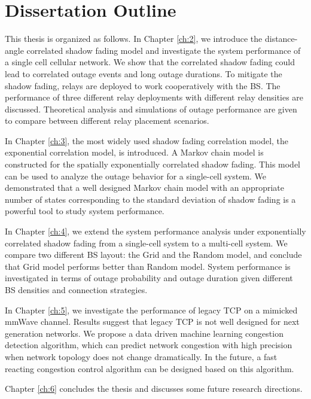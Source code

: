 \section{Dissertation Outline}
\par This thesis is organized as follows. In Chapter \ref{ch:2}, we introduce the distance-angle correlated shadow fading model and investigate the system performance of a single cell cellular network. We show that the correlated shadow fading could lead to correlated outage events and long outage durations. To mitigate the shadow fading, relays are deployed to work cooperatively with the BS. The performance of three different relay deployments with different relay densities are discussed. Theoretical analysis and simulations of outage performance are given to compare between different relay placement scenarios. 
\par In Chapter \ref{ch:3}, the most widely used shadow fading correlation model, the exponential correlation model, is introduced. A Markov chain model is constructed for the spatially exponentially correlated shadow fading. This model can be used to analyze the outage behavior for a single-cell system. We demonstrated that a well designed Markov chain model with an appropriate number of states corresponding to the standard deviation of shadow fading is a powerful tool to study system performance.
\par In Chapter \ref{ch:4}, we extend the system performance analysis under exponentially correlated shadow fading from a single-cell system to a multi-cell system. We compare two different BS layout: the Grid and the Random model, and conclude that Grid model performs better than Random model. System performance is investigated in terms of outage probability and outage duration given different BS densities and connection strategies. 
\par In Chapter \ref{ch:5}, we investigate the performance of legacy TCP on a mimicked mmWave channel. Results suggest that legacy TCP is not well designed for next generation networks. We propose a data driven machine learning congestion detection algorithm, which can predict network congestion with high precision when network topology does not change dramatically. In the future, a fast reacting congestion control algorithm can be designed based on this algorithm.
\par Chapter \ref{ch:6} concludes the thesis and discusses some future research directions.








